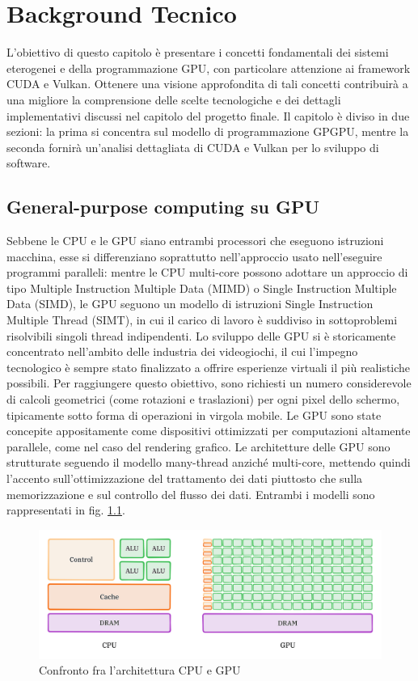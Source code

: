 \chapter{Background Tecnico}
\label{sec:background}


L'obiettivo di questo capitolo è presentare i concetti fondamentali dei sistemi eterogenei e della programmazione GPU, con particolare attenzione ai framework CUDA e Vulkan. Ottenere una visione approfondita di tali concetti contribuirà a una migliore la comprensione delle scelte tecnologiche e dei dettagli implementativi discussi nel capitolo del progetto finale. Il capitolo è diviso in due sezioni: la prima si concentra sul modello di programmazione GPGPU, mentre la seconda fornirà un'analisi dettagliata di CUDA e Vulkan per lo sviluppo di software.

\section[General-purpose computing su GPU]{General-purpose computing su GPU}

Sebbene le CPU e le GPU siano entrambi processori che eseguono istruzioni macchina, esse si differenziano soprattutto nell'approccio usato nell'eseguire programmi paralleli: mentre le CPU multi-core possono adottare un approccio di tipo Multiple Instruction Multiple Data (\gls{MIMD}) o Single Instruction Multiple Data (\gls{SIMD}), le GPU seguono un modello di istruzioni Single Instruction Multiple Thread (\gls{SIMT}), in cui il carico di lavoro è suddiviso in sottoproblemi risolvibili singoli thread indipendenti. Lo sviluppo delle GPU si è storicamente concentrato nell'ambito delle industria dei videogiochi, il cui l'impegno tecnologico è sempre stato finalizzato a offrire esperienze virtuali il più realistiche possibili. Per raggiungere questo obiettivo, sono richiesti un numero considerevole di calcoli geometrici (come rotazioni e traslazioni) per ogni pixel dello schermo, tipicamente sotto forma di operazioni in virgola mobile. Le GPU sono state concepite appositamente come dispositivi ottimizzati per computazioni altamente parallele, come nel caso del rendering grafico. Le architetture delle GPU sono strutturate seguendo il modello many-thread anziché multi-core, mettendo quindi l'accento sull'ottimizzazione del trattamento dei dati piuttosto che sulla memorizzazione e sul controllo del flusso dei dati.
Entrambi i modelli sono rappresentati in fig. \ref{fig:cpu_vs_gpu}.

\begin{figure}[ht]
    \centering
    \includegraphics[width=.9\linewidth]{images/chapter2/cpu_vs_gpu.png}
    \caption{Confronto fra l'architettura CPU e GPU}
    \label{fig:cpu_vs_gpu}
\end{figure}

